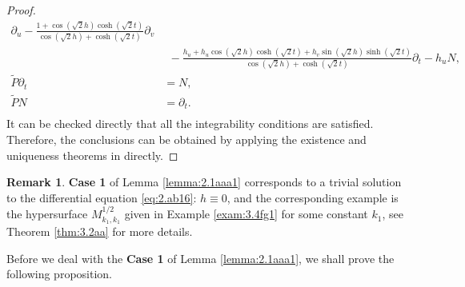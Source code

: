 \documentclass[reqno]{amsart}%
\theoremstyle{definition}
\newtheorem{remark}{Remark}[section]
\numberwithin{equation}{section}
\begin{document}
\begin{proof}
\begin{equation}
\begin{aligned}
	\partial_u-
	\tfrac{1+\cos(\sqrt{2}h)\cosh(\sqrt{2}t)}{\cos(\sqrt{2}h)+\cosh(\sqrt{2}t)}\partial_v\\
	&\ \  -\tfrac{h_u+h_u\cos(\sqrt{2}h)\cosh(\sqrt{2}t)+h_v\sin(\sqrt{2}h)\sinh(\sqrt{2}t)}
{{\cos(\sqrt{2}h)+\cosh(\sqrt{2}t)}}\partial_t-h_uN,\\
	\tilde{P}\partial_t&=N,\\
	\tilde{P}N&=\partial_t.\\	
\end{aligned}
\end{equation}
It can be checked  directly that all the integrability conditions are satisfied.
Therefore, the conclusions can be obtained by applying  the existence and uniqueness theorems in  \cite{K,L-T-V} directly.
\end{proof}


\begin{remark}\label{rem:3.1aaa1}
{\bf Case 1} of Lemma \ref{lemma:2.1aaa1}
corresponds to a trivial solution to the differential equation \eqref{eq:2.ab16}: $h\equiv0$,
and the corresponding example is the hypersurface
$M_{k_1,k_1}^{1/2}$ given in Example \ref{exam:3.4fg1} for some constant $k_1$,
see Theorem  \ref{thm:3.2aa} for more details.
\end{remark}

Before we deal with the {\bf Case 1} of Lemma \ref{lemma:2.1aaa1},
we shall prove the following proposition.
\end{document}
